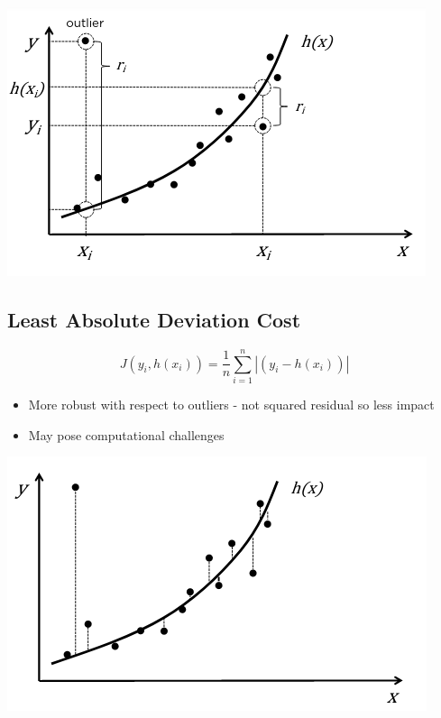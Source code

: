 \documentclass{article}[18pt]
\begin{document}
\begin{center}
	\includegraphics[scale=0.7]{"Least Squares Deviation"}
\end{center}
\subsection{Least Absolute Deviation Cost}
$$J(y_i,h(x_i))=\dfrac{1}{n}\sum_{i=1}^{n}{|(y_i-h(x_i))|}$$
\begin{itemize}
	\item More robust with respect to outliers - not squared residual so less impact
	\item May pose computational challenges
\end{itemize}
\begin{center}
	\includegraphics[scale=0.7]{"Least Absolute Deviation"}
\end{center}
\end{document}

